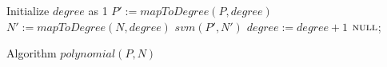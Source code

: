 \begin{algorithm}[t]
\SetAlgoVlined
\Indm
\Indp
    Initialize $degree$ as 1\;
     {
        $P' := \mathit{mapToDegree}(P, \mathit{degree})$\;
        $N' := \mathit{mapToDegree}(N, \mathit{degree})$\;
         {
            \Return $\mathit{svm}(P', N')$\;
        }
    	$\mathit{degree} := \mathit{degree} + 1$\;
    }
    \Return $\textsc{null}$;
\caption{Algorithm $\mathit{polynomial}(P,N)$}
\label{alg:polynomialSVM}
\end{algorithm}
\vspace{-2mm}








